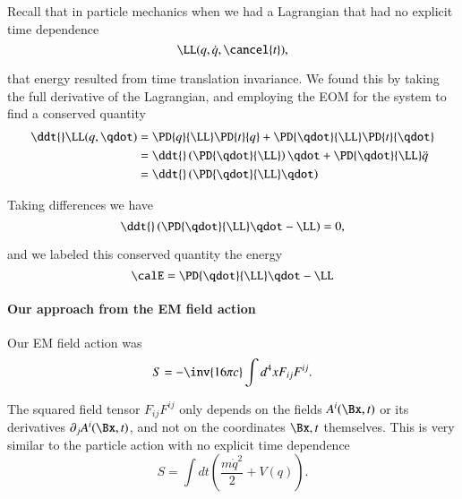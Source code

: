 Recall that in particle mechanics when we had a Lagrangian that had no explicit time dependence
%
\begin{equation}\label{eqn:relativisticElectrodynamicsL21b:380}
\LL(q, \dot{q}, \cancel{t}),
\end{equation}

that energy resulted from time translation invariance.  We found this by taking the full derivative of the Lagrangian, and employing the EOM for the system to find a conserved quantity
%
\begin{equation}\label{eqn:relativisticElectrodynamicsL21b:560}
\begin{aligned}
\ddt{} \LL(q, \qdot)
&=
\PD{q}{\LL} \PD{t}{q}
+\PD{\qdot}{\LL} \PD{t}{\qdot} \\
&=
\ddt{} \left( \PD{\qdot}{\LL} \right) \qdot
+\PD{\qdot}{\LL} \ddot{q} \\
&=
\ddt{} \left( \PD{\qdot}{\LL} \qdot \right)
\end{aligned}
\end{equation}

Taking differences we have
%
\begin{equation}\label{eqn:relativisticElectrodynamicsL21b:400}
\ddt{} \left( \PD{\qdot}{\LL} \qdot -\LL \right) = 0,
\end{equation}

and we labeled this conserved quantity the energy
%
\begin{equation}\label{eqn:relativisticElectrodynamicsL21b:420}
\calE = \PD{\qdot}{\LL} \qdot -\LL
\end{equation}

\paragraph{Our approach from the EM field action}

Our EM field action was
%
\begin{equation}\label{eqn:relativisticElectrodynamicsL21b:500}
S = -\inv{16 \pi c} \int d^4 x F_{i j} F^{i j}.
\end{equation}

The squared field tensor \(F_{i j} F^{i j}\) only depends on the fields \(A^i(\Bx, t)\) or its derivatives \(\partial_j A^i(\Bx, t)\), and not on the coordinates \(\Bx, t\) themselves.  This is very similar to the particle action with no explicit time dependence
%
\begin{equation}\label{eqn:relativisticElectrodynamicsL21b:520}
S = \int dt \left( \frac{m \dot{q}^2}{2} + V(q) \right).
\end{equation}

